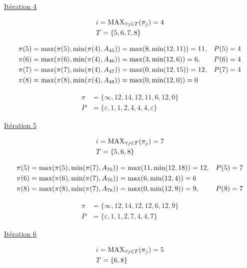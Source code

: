 \documentclass{article}
\begin{document}
\underline{Itération 4}

\begin{align*}
  &i = \operatorname{MAX}_{\forall j \in T}(\pi_j) = 4\\
  &T = \{5,6,7,8\}
\end{align*}

\begin{align*}
  &\pi(5) = \operatorname{max}(\pi(5), \operatorname{min}(\pi(4), A_{45})) = \operatorname{max}(8, \operatorname{min}(12,11)) = 11, &P(5) = 4\\
  &\pi(6) = \operatorname{max}(\pi(6), \operatorname{min}(\pi(4), A_{46})) = \operatorname{max}(3, \operatorname{min}(12,6)) = 6, &P(6) = 4\\
  &\pi(7) = \operatorname{max}(\pi(7), \operatorname{min}(\pi(4), A_{47})) = \operatorname{max}(0, \operatorname{min}(12,15)) = 12, &P(7) = 4\\
  &\pi(8) = \operatorname{max}(\pi(8), \operatorname{min}(\pi(4), A_{48})) = \operatorname{max}(0, \operatorname{min}(12,0)) = 0
\end{align*}

\begin{align*}
  \pi &= \{\infty,12,14,12,11,6,12,0\}\\
  P &= \{\varepsilon, 1, 1, 2, 4, 4, 4, \varepsilon\}
\end{align*}

\underline{Itération 5}

\begin{align*}
  &i = \operatorname{MAX}_{\forall j \in T}(\pi_j) = 7\\
  &T = \{5,6,8\}
\end{align*}

\begin{align*}
  &\pi(5) = \operatorname{max}(\pi(5), \operatorname{min}(\pi(7), A_{75})) = \operatorname{max}(11, \operatorname{min}(12,18)) = 12, &P(5) = 7\\
  &\pi(6) = \operatorname{max}(\pi(6), \operatorname{min}(\pi(7), A_{76})) = \operatorname{max}(6, \operatorname{min}(12,4)) = 6\\
  &\pi(8) = \operatorname{max}(\pi(8), \operatorname{min}(\pi(7), A_{78})) = \operatorname{max}(0, \operatorname{min}(12,9)) = 9, &P(8) = 7
\end{align*}

\begin{align*}
  \pi &= \{\infty,12,14,12,12,6,12,9\}\\
  P &= \{\varepsilon, 1, 1, 2, 7, 4, 4, 7\}
\end{align*}

\underline{Itération 6}

\begin{align*}
  &i = \operatorname{MAX}_{\forall j \in T}(\pi_j) = 5\\
  &T = \{6,8\}
\end{align*}
\end{document}
